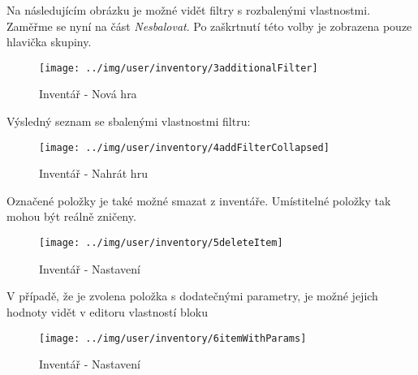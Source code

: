 \FloatBarrier

Na následujícím obrázku je možné vidět filtry s rozbalenými vlastnostmi. Zaměřme se nyní na část \textit{Nesbalovat}. Po zaškrtnutí této volby je zobrazena pouze hlavička skupiny.

\begin{figure}[!h]\centering
\texttt{[image: ../img/user/inventory/3additionalFilter]}

\caption{Inventář - Nová hra}
\label{fig:user_inventory_3additionalFilter}

\end{figure}

\FloatBarrier

Výsledný seznam se sbalenými vlastnostmi filtru:

\begin{figure}[!h]\centering
\texttt{[image: ../img/user/inventory/4addFilterCollapsed]}

\caption{Inventář - Nahrát hru}
\label{fig:user_inventory_4addFilterCollapsed}

\end{figure}

\FloatBarrier

Označené položky je také možné smazat z inventáře. Umístitelné položky tak mohou být reálně zničeny. 

\begin{figure}[!h]\centering
\texttt{[image: ../img/user/inventory/5deleteItem]}

\caption{Inventář - Nastavení}
\label{fig:user_inventory_5deleteItem}

\end{figure}

\FloatBarrier
V případě, že je zvolena položka s dodatečnými parametry, je možné jejich hodnoty vidět v editoru vlastností bloku

\begin{figure}[!h]\centering
\texttt{[image: ../img/user/inventory/6itemWithParams]}

\caption{Inventář - Nastavení}
\label{fig:user_inventory_6itemWithParams}

\end{figure}


\FloatBarrier